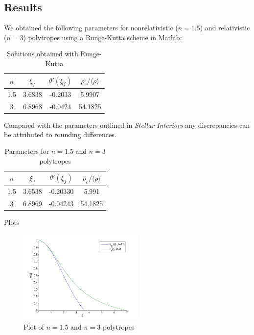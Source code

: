 \documentclass[twoside]{article}
\begin{document}
\begin{multicols}{2}

\section{Results}

We obtained the following parameters for nonrelativistic (\(n=1.5\)) and
relativistic (\(n=3\)) polytropes using a Runge-Kutta scheme in Matlab:

\begin{table}[H]
\caption{Solutions obtained with Runge-Kutta}
\centering
\begin{tabular}{c | c c c}
\toprule
\(n\) & \(\xi_f\) & \(\theta'(\xi_f)\) & \(\rho_c/\langle \rho \rangle\) \\
\midrule
1.5 & 3.6838 & -0.2033 & 5.9907 \\
3 & 6.8968 & -0.0424 & 54.1825 \\
\bottomrule
\end{tabular}
\end{table}


Compared with the parameters outlined in \textit{Stellar
Interiors}\cite{hansen2004} any discrepancies can be attributed to rounding
differences.

\begin{table}[H]
\caption{Parameters for \(n=1.5\) and \(n=3\) polytropes\cite[p.340]{hansen2004}}
\centering
\begin{tabular}{c | c c c}
\toprule
\(n\) & \(\xi_f\) & \(\theta'(\xi_f)\) & \(\rho_c/\langle \rho \rangle\) \\
\midrule
1.5 & 3.6538 & -0.20330 & 5.991 \\
3 & 6.8969 & -0.04243 & 54.1825 \\
\bottomrule
\end{tabular}
\end{table}

Plots

\begin{figure}[H]
    \caption{Plot of \(n=1.5\) and \(n=3\) polytropes}
    \includegraphics[width=0.55\textwidth]{lesolution.pdf}
\end{figure}


\end{multicols}
\end{document}
